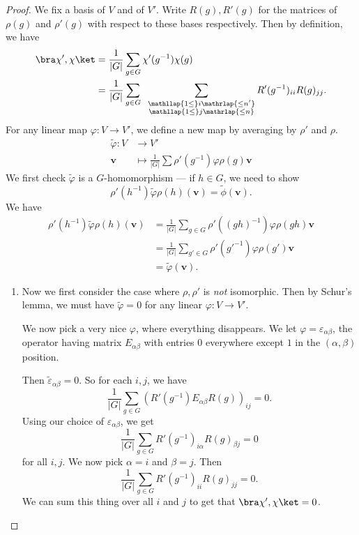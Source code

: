 \documentclass[a4paper]{article}
\begin{document}
\begin{proof}
  We fix a basis of $V$ and of $V'$. Write $R(g), R'(g)$ for the matrices of $\rho(g)$ and $\rho'(g)$ with respect to these bases respectively. Then by definition, we have
  \begin{align*}
    \bra \chi', \chi\ket &= \frac{1}{|G|} \sum_{g \in G} \chi'(g^{-1}) \chi(g)\\
    &= \frac{1}{|G|} \sum_{g \in G}\;\;\sum_{\substack{\mathllap{1 \leq}i\mathrlap{\leq n'}\\ \mathllap{1\leq}j\mathrlap{\leq n}}}R'(g^{-1})_{ii} R(g)_{jj}.
  \end{align*}
  For any linear map $\varphi: V \to V'$, we define a new map by averaging by $\rho'$ and $\rho$.
  \begin{align*}
    \tilde{\varphi}: V &\to V'\\
    \mathbf{v} &\mapsto \frac{1}{|G|} \sum \rho'(g^{-1}) \varphi \rho(g) \mathbf{v}
  \end{align*}
  We first check $\tilde{\varphi}$ is a $G$-homomorphism --- if $h \in G$, we need to show
  \[
    \rho'(h^{-1}) \tilde{\varphi} \rho(h) (\mathbf{v}) = \tilde{\phi}(\mathbf{v}).
  \]
  We have
  \begin{align*}
    \rho'(h^{-1})\tilde{\varphi}\rho(h) (\mathbf{v}) &= \frac{1}{|G|} \sum_{g \in G} \rho'((gh)^{-1})\varphi\rho(gh)\mathbf{v}\\
    &= \frac{1}{|G|} \sum_{g' \in G} \rho'(g'^{-1}) \varphi \rho(g') \mathbf{v}\\
    &= \tilde{\varphi}(\mathbf{v}).
  \end{align*}
  \begin{enumerate}
    \item Now we first consider the case where $\rho, \rho'$ is \emph{not} isomorphic. Then by Schur's lemma, we must have $\tilde{\varphi} = 0$ for any linear $\varphi: V \to V'$.

      We now pick a very nice $\varphi$, where everything disappears. We let $\varphi = \varepsilon_{\alpha\beta}$, the operator having matrix $E_{\alpha\beta}$ with entries $0$ everywhere except $1$ in the $(\alpha,\beta)$ position.

      Then $\tilde{\varepsilon}_{\alpha\beta} = 0$. So for each $i, j$, we have
      \[
        \frac{1}{|G|} \sum_{g \in G} (R'(g^{-1}) E_{\alpha\beta}R(g))_{ij} = 0.
      \]
      Using our choice of $\varepsilon_{\alpha\beta}$, we get
      \[
        \frac{1}{|G|} \sum_{g \in G} R'(g^{-1})_{i\alpha} R(g)_{\beta j} = 0
      \]
      for all $i, j$. We now pick $\alpha = i$ and $\beta = j$. Then
      \[
        \frac{1}{|G|} \sum_{g \in G}R'(g^{-1})_{ii} R(g)_{jj} = 0.
      \]
      We can sum this thing over all $i$ and $j$ to get that $\bra \chi', \chi\ket = 0$.


\end{enumerate}
\end{proof}
\end{document}

